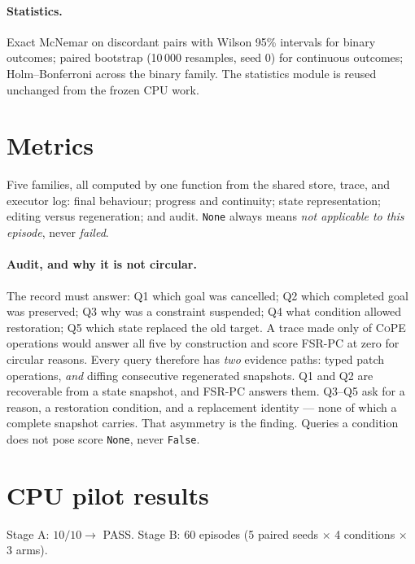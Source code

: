 \documentclass[11pt]{article}
\newcommand{\cope}{\textsc{CoPE}}
\newcommand{\fsrpc}{\textsc{FSR-PC}}
\begin{document}
\paragraph{Statistics.}
Exact McNemar on discordant pairs with Wilson 95\% intervals for binary
outcomes; paired bootstrap (10\,000 resamples, seed 0) for continuous outcomes;
Holm--Bonferroni across the binary family. The statistics module is reused
unchanged from the frozen CPU work.

\section{Metrics}

Five families, all computed by one function from the shared store, trace, and
executor log: final behaviour; progress and continuity; state representation;
editing versus regeneration; and audit. \texttt{None} always means \emph{not
applicable to this episode}, never \emph{failed}.

\paragraph{Audit, and why it is not circular.}
The record must answer: Q1 which goal was cancelled; Q2 which completed goal was
preserved; Q3 why was a constraint suspended; Q4 what condition allowed
restoration; Q5 which state replaced the old target. A trace made only of
\cope{} operations would answer all five by construction and score \fsrpc{} at
zero for circular reasons. Every query therefore has \emph{two} evidence paths:
typed patch operations, \emph{and} diffing consecutive regenerated snapshots.
Q1 and Q2 are recoverable from a state snapshot, and \fsrpc{} answers them.
Q3--Q5 ask for a reason, a restoration condition, and a replacement identity ---
none of which a complete snapshot carries. That asymmetry is the finding.
Queries a condition does not pose score \texttt{None}, never \texttt{False}.

\section{CPU pilot results}

Stage A: $10/10 \to$ PASS. Stage B: 60 episodes (5 paired seeds $\times$ 4
conditions $\times$ 3 arms).
\end{document}
